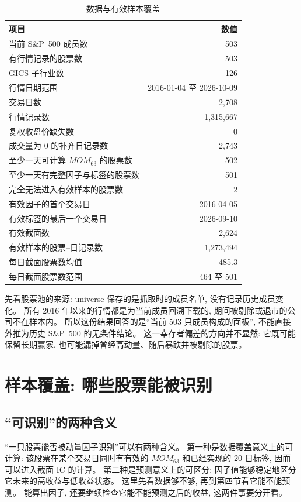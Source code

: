 \documentclass[11pt,a4paper]{article}
\newcommand{\SP}{S\&P~500}
\newcommand{\MOM}{\mathit{MOM}}
\begin{document}
\begin{table}[H]
\centering
\caption{数据与有效样本覆盖}
\label{tab:coverage}
\begin{tabular}{lr}
\toprule
项目 & 数值 \\
\midrule
当前 \SP{} 成员数 & 503 \\
有行情记录的股票数 & 503 \\
GICS 子行业数 & 126 \\
行情日期范围 & 2016-01-04 至 2026-10-09 \\
交易日数 & 2{,}708 \\
行情记录数 & 1{,}315{,}667 \\
复权收盘价缺失数 & 0 \\
成交量为 0 的补齐日记录数 & 2{,}743 \\
\addlinespace
至少一天可计算 $\MOM_{63}$ 的股票数 & 502 \\
至少一天有完整因子与标签的股票数 & 501 \\
完全无法进入有效样本的股票数 & 2 \\
\addlinespace
有效因子的首个交易日 & 2016-04-05 \\
有效标签的最后一个交易日 & 2026-09-10 \\
有效截面数 & 2{,}624 \\
有效样本的股票--日记录数 & 1{,}273{,}494 \\
每日截面股票数均值 & 485.3 \\
每日截面股票数范围 & 464 至 501 \\
\bottomrule
\end{tabular}
\end{table}

先看股票池的来源: universe 保存的是抓取时的成员名单, 没有记录历史成员变化。
所有 2016 年以来的行情都是为当前成员回溯下载的, 期间被剔除或退市的公司不在样本内。
所以这份结果回答的是“当前 503 只成员构成的面板”, 不能直接外推为历史 \SP{} 的无条件结论。
这一幸存者偏差的方向并不显然: 它既可能保留长期赢家, 也可能漏掉曾经高动量、随后暴跌并被剔除的股票。

\section{样本覆盖: 哪些股票能被识别}

\subsection{“可识别”的两种含义}

“一只股票能否被动量因子识别”可以有两种含义。
第一种是数据覆盖意义上的可计算: 该股票在某个交易日同时有有效的 $\MOM_{63}$ 和已经实现的 20 日标签, 因而可以进入截面 IC 的计算。
第二种是预测意义上的可区分: 因子值能够稳定地区分它未来的高收益与低收益状态。
这里先看数据够不够, 再到第四节看它能不能预测。
能算出因子, 还要继续检查它能不能预测之后的收益, 这两件事要分开看。
\end{document}
